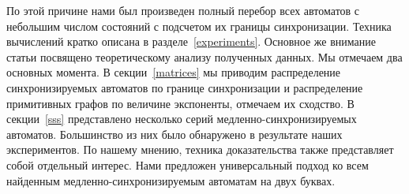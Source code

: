 \documentclass[11pt]{article}
\newcommand{\sa}{synchronizing automata}
\newcommand{\rl}{reset length}
\begin{document}


По этой причине нами был произведен полный перебор всех автоматов с небольшим
числом состояний с подсчетом их границы синхронизации. Техника вычислений кратко
описана в разделе~\ref{experiments}. Основное же внимание статьи посвящено
теоретическому анализу полученных данных. Мы отмечаем два основных момента.
В секции~\ref{matrices} мы приводим распределение синхронизируемых автоматов
по границе синхронизации и распределение примитивных графов по величине
экспоненты, отмечаем их сходство.
В секции~\ref{sss} представлено несколько серий медленно-синхронизируемых автоматов.
Большинство из них было обнаружено в результате наших экспериментов.
По нашему мнению, техника доказательства также представляет собой отдельный интерес.
Нами предложен универсальный подход ко всем найденным медленно-синхронизируемым автоматам на
двух буквах.


\end{document}
